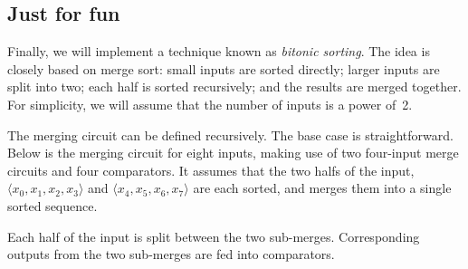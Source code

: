 \documentclass[12pt,a4paper]{article}
\def\seq#1{\langle #1 \rangle}
\begin{document}

\subsection*{Just for fun}

Finally, we will implement a technique known as \emph{bitonic
  sorting}.  The idea is closely based on merge sort: small inputs are
sorted directly; larger inputs are split into two; each half is sorted
recursively; and the results are merged together.  For simplicity, we
will assume that the number of inputs is a power of~2.

The merging circuit can be defined recursively.  The base case is
straightforward.  Below is the merging circuit for eight inputs, making use of
two four-input merge circuits and four comparators.  It assumes that the two
halfs of the input, $\seq{x_0,x_1,x_2,x_3}$ and $\seq{x_4,x_5,x_6,x_7}$ are
each sorted, and merges them into a single sorted sequence.
%
\begin{center}
\end{center}
%
Each half of the input is split between the two sub-merges.  Corresponding
outputs from the two sub-merges are fed into comparators.
\end{document}
